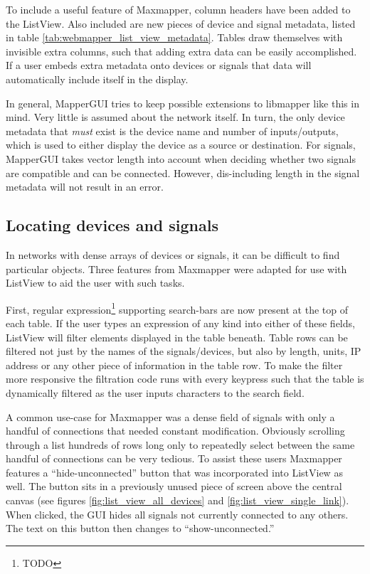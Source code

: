 To include a useful feature of Maxmapper, column headers have been added to the ListView. Also included are new pieces of device and signal metadata, listed in table \ref{tab:webmapper_list_view_metadata}. Tables draw themselves with invisible extra columns, such that adding extra data can be easily accomplished. If a user embeds extra metadata onto devices or signals that data will automatically include itself in the display.  

In general, MapperGUI tries to keep possible extensions to libmapper like this in mind. Very little is assumed about the network itself. In turn, the only device metadata that \emph{must} exist is the device name and number of inputs/outputs, which is used to either display the device as a source or destination. For signals, MapperGUI takes vector length into account when deciding whether two signals are compatible and can be connected. However, dis-including length in the signal metadata will not result in an error.
	

	\subsection{Locating devices and signals} %
	\label{sub:locating_devices_and_signals}

In networks with dense arrays of devices or signals, it can be difficult to find particular objects. Three features from Maxmapper were adapted for use with ListView to aid the user with such tasks.

First, regular expression\footnote{TODO} supporting search-bars are now present at the top of each table. If the user types an expression of any kind into either of these fields, ListView will filter elements displayed in the table beneath. Table rows can be filtered not just by the names of the signals/devices, but also by length, units, IP address or any other piece of information in the table row. To make the filter more responsive the filtration code runs with every keypress such that the table is dynamically filtered as the user inputs characters to the search field. 

A common use-case for Maxmapper was a dense field of signals with only a handful of connections that needed constant modification. Obviously scrolling through a list hundreds of rows long only to repeatedly select between the same handful of connections can be very tedious. To assist these users Maxmapper features a ``hide-unconnected'' button that was incorporated into ListView as well. The button sits in a previously unused piece of screen above the central canvas (see figures \ref{fig:list_view_all_devices} and \ref{fig:list_view_single_link}). When clicked, the GUI hides all signals not currently connected to any others. The text on this button then changes to ``show-unconnected.''

